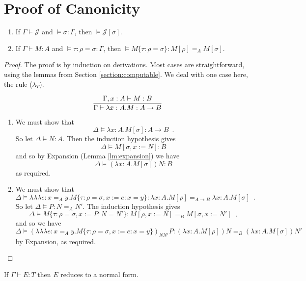 \documentclass[a4paper,UKenglish]{lipics-v2016}
\newcommand*{\triplelambda}{\ensuremath{\lambda \!\! \lambda \!\! \lambda}}
\theoremstyle{plain}
\theoremstyle{definition}
\begin{document}
\section{Proof of Canonicity}

\begin{theorem}
\begin{enumerate}
\item
If $\Gamma \vdash \mathcal{J}$ and $\models \sigma : \Gamma$, then $\models \mathcal{J} [ \sigma ]$.
\item
If $\Gamma \vdash M : A$ and $\models \tau : \rho = \sigma : \Gamma$, then $\models M \{ \tau : \rho = \sigma \} : M [ \rho ] =_A M [ \sigma ]$.
\end{enumerate}
\end{theorem}

\begin{proof}
The proof is by induction on derivations.  Most cases are straightforward, using the lemmas from
Section \ref{section:computable}.  We deal with one case here, the rule ($\lambda_T$).

$$ \infer{\Gamma \vdash \lambda x:A.M : A \rightarrow B}{\Gamma, x : A \vdash M : B} $$

\begin{enumerate}
\item
We must show that
\[ \Delta \models \lambda x:A.M[\sigma] : A \rightarrow B \enspace . \]
So let $\Delta \models N : A$.  Then the induction hypothesis gives
\[ \Delta \models M[\sigma, x:=N] : B \]
and so by Expansion (Lemma \ref{lm:expansion}) we have
\[ \Delta \models (\lambda x:A.M[\sigma])N : B \]
as required.
\item
We must show that
\[ \Delta \models \triplelambda e : x =_A y. M \{ \tau : \rho = \sigma, x := e : x = y \} : \lambda x:A.M [ \rho ] =_{A \rightarrow B} \lambda x:A.M [ \sigma ] \enspace . \]
So let $\Delta \models P : N =_A N'$.  The induction hypothesis gives
\[ \Delta \models M \{ \tau : \rho = \sigma, x := P : N = N' \} : M [\rho, x := N] =_B M [\sigma, x := N'] \enspace , \]
and so we have
\[ \Delta \models (\triplelambda e : x =_A y. M \{ \tau : \rho = \sigma, x := e : x = y \})_{N N'} P : (\lambda x:A.M [ \rho ])N =_B (\lambda x:A.M [ \sigma ])N'\]
by Expansion, as required.
\end{enumerate}
\end{proof}

\begin{corollary}
If $\Gamma \vdash E : T$ then $E$ reduces to a normal form.
\end{corollary}
\end{document}
